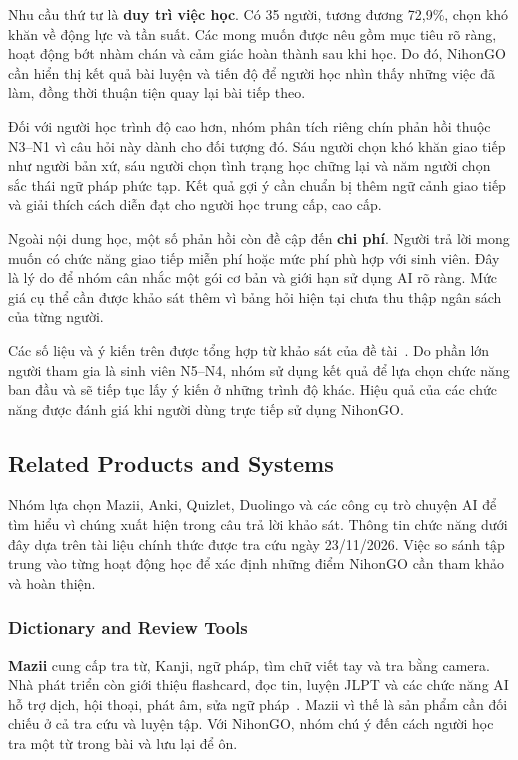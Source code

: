Nhu cầu thứ tư là \textbf{duy trì việc học}. Có 35 người, tương đương 72,9\%, chọn khó khăn về động lực và tần suất. Các mong muốn được nêu gồm mục tiêu rõ ràng, hoạt động bớt nhàm chán và cảm giác hoàn thành sau khi học. Do đó, NihonGO cần hiển thị kết quả bài luyện và tiến độ để người học nhìn thấy những việc đã làm, đồng thời thuận tiện quay lại bài tiếp theo.

Đối với người học trình độ cao hơn, nhóm phân tích riêng chín phản hồi thuộc N3--N1 vì câu hỏi này dành cho đối tượng đó. Sáu người chọn khó khăn giao tiếp như người bản xứ, sáu người chọn tình trạng học chững lại và năm người chọn sắc thái ngữ pháp phức tạp. Kết quả gợi ý cần chuẩn bị thêm ngữ cảnh giao tiếp và giải thích cách diễn đạt cho người học trung cấp, cao cấp.

Ngoài nội dung học, một số phản hồi còn đề cập đến \textbf{chi phí}. Người trả lời mong muốn có chức năng giao tiếp miễn phí hoặc mức phí phù hợp với sinh viên. Đây là lý do để nhóm cân nhắc một gói cơ bản và giới hạn sử dụng AI rõ ràng. Mức giá cụ thể cần được khảo sát thêm vì bảng hỏi hiện tại chưa thu thập ngân sách của từng người.

Các số liệu và ý kiến trên được tổng hợp từ khảo sát của đề tài~\cite{nihongo-survey2026}. Do phần lớn người tham gia là sinh viên N5--N4, nhóm sử dụng kết quả để lựa chọn chức năng ban đầu và sẽ tiếp tục lấy ý kiến ở những trình độ khác. Hiệu quả của các chức năng được đánh giá khi người dùng trực tiếp sử dụng NihonGO.

\subsection{Related Products and Systems}

Nhóm lựa chọn Mazii, Anki, Quizlet, Duolingo và các công cụ trò chuyện AI để tìm hiểu vì chúng xuất hiện trong câu trả lời khảo sát. Thông tin chức năng dưới đây dựa trên tài liệu chính thức được tra cứu ngày 23/11/2026. Việc so sánh tập trung vào từng hoạt động học để xác định những điểm NihonGO cần tham khảo và hoàn thiện.

\subsubsection{Dictionary and Review Tools}

\textbf{Mazii} cung cấp tra từ, Kanji, ngữ pháp, tìm chữ viết tay và tra bằng camera. Nhà phát triển còn giới thiệu flashcard, đọc tin, luyện JLPT và các chức năng AI hỗ trợ dịch, hội thoại, phát âm, sửa ngữ pháp~\cite{mazii-app}. Mazii vì thế là sản phẩm cần đối chiếu ở cả tra cứu và luyện tập. Với NihonGO, nhóm chú ý đến cách người học tra một từ trong bài và lưu lại để ôn.

